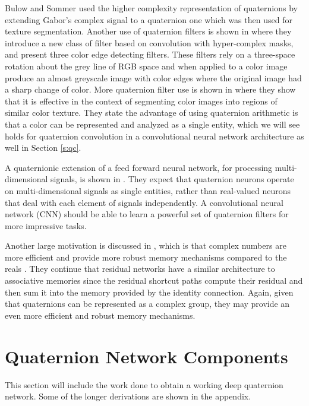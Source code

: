 \documentclass[14pt,a4paper]{article}
\begin{document}
Bulow and Sommer \cite{bulow2001hypercomplex} used the higher complexity representation of quaternions by extending Gabor's complex signal to a quaternion one which was then used for texture segmentation.
Another use of quaternion filters is shown in \cite{sangwine2000colour} where they introduce a new class of filter based on convolution with hyper-complex masks, and present three color edge detecting filters. 
These filters rely on a three-space rotation about the grey line of RGB space and when applied to a color image produce an almost greyscale image with color edges where the original image had a sharp change of color.
More quaternion filter use is shown in \cite{shi2007quaternion} where they show that it is effective in the context of segmenting color images into regions of similar color texture. 
They state the advantage of using quaternion arithmetic is that a color can be represented and analyzed as a single entity, which we will see holds for quaternion convolution in a convolutional neural network architecture as well in Section \ref{s:qc}.

A quaternionic extension of a feed forward neural network, for processing multi-dimensional signals, is shown in \cite{minemoto2017feed}.
They expect that quaternion neurons operate on multi-dimensional signals as single entities, rather than real-valued neurons that deal with each element of signals independently.
A convolutional neural network (CNN) should be able to learn a powerful set of quaternion filters for more impressive tasks.

Another large motivation is discussed in \cite{trabelsi2017deep}, which is that complex numbers are more efficient and provide more robust memory mechanisms compared to the reals \cite{bulow1999hypercomplex, sangwine2000colour, bulow2001hypercomplex}.
They continue that residual networks have a similar architecture to associative memories since the residual shortcut paths compute their residual and then sum it into the memory provided by the identity connection.
Again, given that quaternions can be represented as a complex group, they may provide an even more efficient and robust memory mechanisms.


\section{Quaternion Network Components}
This section will include the work done to obtain a working deep quaternion network. 
Some of the longer derivations are shown in the appendix.
\end{document}
